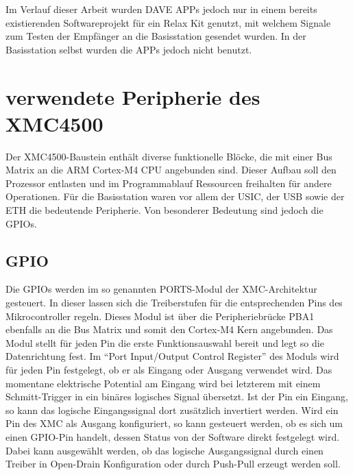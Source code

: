 Im Verlauf dieser Arbeit wurden DAVE  APPs jedoch nur in einem bereits existierenden Softwareprojekt für ein Relax Kit genutzt, mit welchem  Signale zum Testen der Empfänger an die Basisstation gesendet wurden. In der Basisstation selbst wurden die APPs jedoch nicht benutzt.


\section{verwendete Peripherie des XMC4500}
Der XMC4500-Baustein enthält diverse funktionelle Blöcke, die mit einer Bus Matrix an die ARM Cortex-M4 \ac{CPU} angebunden sind. Dieser Aufbau soll den Prozessor entlasten und im Programmablauf Ressourcen freihalten für andere Operationen.%
Für die Basisstation waren vor allem der \acs{USIC}, der \ac{USB} sowie der \ac{ETH} die bedeutende Peripherie. Von besonderer Bedeutung sind jedoch die \acp{GPIO}. %


\subsection{GPIO}
Die \acp{GPIO} werden im so genannten PORTS-Modul der XMC-Architektur gesteuert. In dieser lassen sich die Treiberstufen für die entsprechenden Pins des Mikrocontroller regeln. Dieses Modul ist über die Peripheriebrücke PBA1 ebenfalls an die Bus Matrix  und somit den Cortex-M4 Kern angebunden.  %
Das Modul stellt für jeden Pin die erste Funktionsauswahl bereit und legt so die Datenrichtung fest. Im \enquote{Port Input/Output Control Register} des Moduls wird für jeden Pin festgelegt, ob er als Eingang oder Ausgang verwendet wird. Das momentane elektrische Potential am Eingang wird bei letzterem mit einem Schmitt-Trigger in ein binäres logisches Signal übersetzt. Ist der Pin ein Eingang, so kann das logische Eingangssignal dort zusätzlich invertiert werden. Wird ein Pin des XMC als Ausgang konfiguriert, so kann gesteuert werden, ob es sich um einen \ac{GPIO}-Pin handelt, dessen Status von der Software direkt festgelegt wird. Dabei kann ausgewählt werden, ob das logische Ausgangssignal durch einen Treiber in Open-Drain Konfiguration oder durch Push-Pull erzeugt werden soll. 

